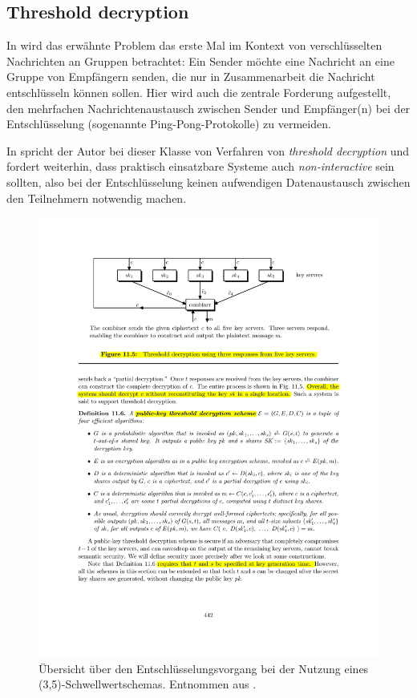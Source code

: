 \subsection*{Threshold decryption}


In \cite{desmedt1987} wird das erwähnte Problem das erste Mal im Kontext von verschlüsselten Nachrichten an Gruppen betrachtet: Ein Sender möchte eine Nachricht an eine Gruppe von Empfängern senden, die nur in Zusammenarbeit die Nachricht entschlüsseln können sollen. Hier wird auch die zentrale Forderung aufgestellt, den mehrfachen Nachrichtenaustausch zwischen Sender und Empfänger(n) bei der Entschlüsselung (sogenannte Ping-Pong-Protokolle) zu vermeiden. 

In \cite{desmedt1993} spricht der Autor bei dieser Klasse von Verfahren von \textit{threshold decryption} und fordert weiterhin, dass praktisch einsatzbare Systeme auch \textit{non-interactive} sein sollten, also bei der Entschlüsselung keinen aufwendigen Datenaustausch zwischen den Teilnehmern notwendig machen.

\begin{figure}[]
    \centering
        \includegraphics[clip, trim=0cm 21.2cm 0cm 2cm, width=1.00\textwidth]{img/threshold_decryption_excerpt.pdf}
    \caption{Übersicht über den Entschlüsselungsvorgang bei der Nutzung eines (3,5)-Schwellwertschemas. Entnommen aus \cite{boneh2016}.}
    \label{fig:threshold_decryption_combiner}
\end{figure}

